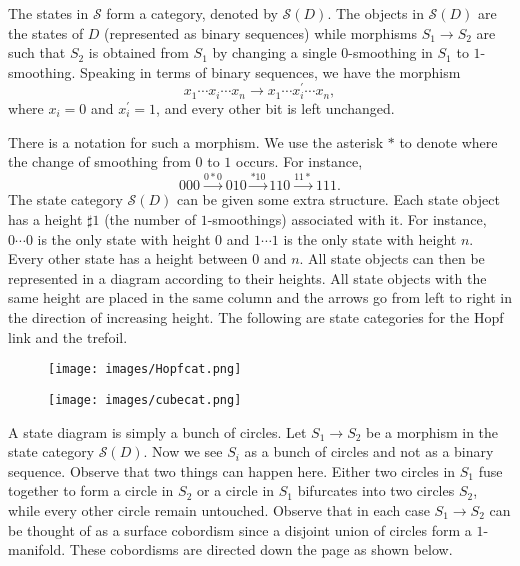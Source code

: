 The states in $\mathcal{S}$ form a category, denoted by $\mathcal{S}(D)$. The objects in $\mathcal{S}(D)$ are the states of $D$ (represented as binary sequences) while morphisms $S_1 \to S_2$ are such that $S_2$ is obtained from $S_1$ by changing a single $0$-smoothing in $S_1$ to $1$-smoothing. Speaking in terms of binary sequences, we have the morphism 
\begin{displaymath}
x_1\cdots x_i \cdots x_n \to x_1\cdots x_i^{\prime} \cdots x_n,
\end{displaymath}
where $x_i = 0$ and $x_i^{\prime} = 1$, and every other bit is left unchanged.

There is a notation for such a morphism. We use the asterisk $*$ to denote where the change of smoothing from $0$ to $1$ occurs. For instance,
\begin{displaymath}
000 \xrightarrow{0*0} 010 \xrightarrow{*10} 110 \xrightarrow{11*} 111.
\end{displaymath}
The state category $\mathcal{S}(D)$ can be given some extra structure. Each state object has a height $\sharp 1$ (the number of $1$-smoothings) associated with it. For instance, $0\cdots0$ is the only state with height $0$ and $1\cdots 1$ is the only state with height $n$. Every other state has a height between $0$ and $n$. All state objects can then be represented in a diagram according to their heights. All state objects with the same height are placed in the same column and the arrows go from left to right in the direction of increasing height. The following are state categories for the Hopf link and the trefoil.

\begin{figure}[h]
  \centering
  \texttt{[image: images/Hopfcat.png]}
\end{figure}

\begin{figure}[h]
  \centering
  \texttt{[image: images/cubecat.png]}
\end{figure}

A state diagram is simply a bunch of circles. Let $S_1 \to S_2$ be a morphism in the state category $\mathcal{S}(D)$. Now we see $S_i$ as a bunch of circles and not as a binary sequence. Observe that two things can happen here. Either two circles in $S_1$ fuse together to form a circle in $S_2$ or a circle in $S_1$ bifurcates into two circles $S_2$, while every other circle remain untouched. Observe that in each case $S_1 \to S_2$ can be thought of as a surface cobordism since a disjoint union of circles form a $1$-manifold. These cobordisms are directed down the page as shown below.

